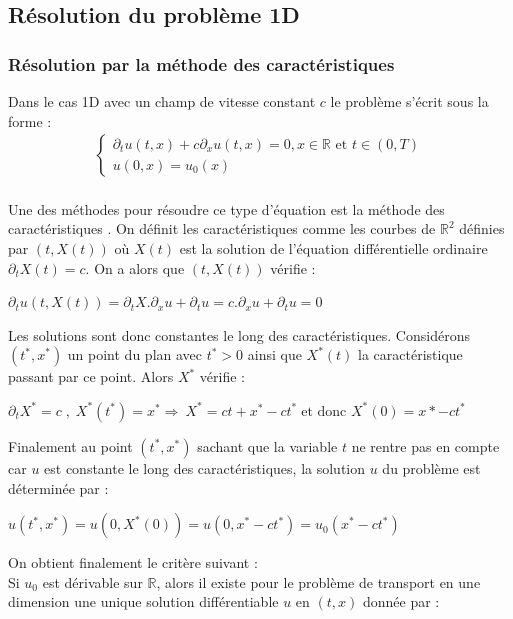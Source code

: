 \documentclass[12pt]{article}
\begin{document}
\subsection{Résolution du problème 1D}
\subsubsection{Résolution par la méthode des caractéristiques}
Dans le cas 1D avec un champ de vitesse constant $c$ le problème s'écrit sous la forme :
\begin{eqnarray*}
    \left\{ 
    \begin{array}{llll}
        \partial_tu(t,x) + c\partial_xu(t,x)=0, x \in \mathbb{R} \text{ et } t \in (0,T)
        \\u(0,x)=u_0(x)
        \end{array}
    \right .
\end{eqnarray*}
\\
Une des méthodes pour résoudre ce type d'équation est la méthode des caractéristiques \cite{ref10}. On définit les caractéristiques comme les courbes de $\mathbb{R}^2$ définies par $(t,X(t))$ où $X(t)$ est la solution de l'équation différentielle ordinaire $\partial_tX(t)=c$.
On a alors que $(t,X(t))$ vérifie :
\\
\begin{center}
        $\partial_tu(t,X(t))=\partial_tX.\partial_xu+\partial_tu
        =c.\partial_xu+\partial_tu =0$
\end{center}
Les solutions sont donc constantes le long des caractéristiques. 
Considérons $(t^*,x^*)$ un point du plan avec $t^*>0$ ainsi que $X^*(t)$ la caractéristique passant par ce point. Alors $X^*$ vérifie :

\begin{center}
        $\partial_tX^*=c \;,\;  X^*(t^*)=x^*
        \Rightarrow\ X^*=ct+x^*-ct^*\; \text{et donc } X^*(0)=x*-ct^*$
\end{center}

\noindent Finalement au point $(t^*,x^*)$ sachant que la variable $t$ ne rentre pas en compte car $u$ est constante le long des caractéristiques, la solution $u$ du problème est déterminée par :

\begin{center}
    $u(t^*,x^*)=u(0,X^*(0))=u(0,x^*-ct^*)=u_0(x^*-ct^*)$
\end{center}

\noindent On obtient finalement le critère suivant :
\\ Si $u_0$ est dérivable sur $\mathbb{R}$, alors il existe pour le problème de transport en une dimension une unique solution différentiable $u$ en $(t,x)$  donnée par :
\end{document}
